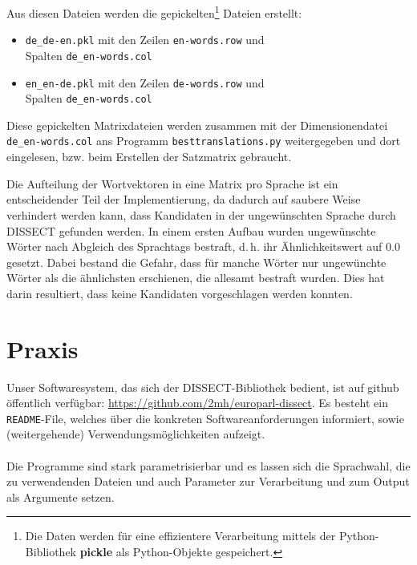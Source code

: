 \documentclass[11pt,twoside,openright]{mpreport}
\begin{document}
Aus diesen Dateien werden die gepickelten\footnote{Die Daten werden für eine effizientere Verarbeitung mittels der Python-Bibliothek \textbf{pickle} als Python-Objekte gespeichert.} Dateien erstellt:
\begin{itemize}
\item \verb+de_de-en.pkl+ mit den Zeilen \verb+en-words.row+ und \\Spalten \verb+de_en-words.col+
\item \verb+en_en-de.pkl+ mit den Zeilen \verb+de-words.row+ und \\Spalten \verb+de_en-words.col+
\end{itemize}

Diese gepickelten Matrixdateien werden zusammen mit der Dimensionendatei \verb+de_en-words.col+ ans Programm \verb+besttranslations.py+ weitergegeben und dort eingelesen, bzw. beim Erstellen der Satzmatrix gebraucht.

Die Aufteilung der Wortvektoren in eine Matrix pro Sprache ist ein entscheidender Teil der Implementierung, da dadurch auf saubere Weise verhindert werden kann, dass Kandidaten in der ungewünschten Sprache durch DISSECT gefunden werden. In einem ersten Aufbau wurden ungewünschte Wörter nach Abgleich des Sprachtags bestraft, d.\,h. ihr Ähnlichkeitswert auf 0.0 gesetzt. Dabei bestand die Gefahr, dass für manche Wörter nur ungewünchte Wörter als die ähnlichsten
erschienen, die allesamt bestraft wurden. Dies hat darin resultiert, dass
keine Kandidaten vorgeschlagen werden konnten.
\chapter{Praxis}
\label{cha:praxis}
Unser Softwaresystem, das sich der DISSECT-Bibliothek bedient, ist
auf github öffentlich verfügbar: \url{https://github.com/2mh/europarl-dissect}.
Es besteht ein \verb+README+-File, welches über die konkreten 
Softwareanforderungen informiert, sowie (weitergehende) 
Verwendungsmöglichkeiten aufzeigt.
\\
\\
Die Programme sind stark parametrisierbar und es lassen sich die Sprachwahl, die zu verwendenden Dateien und auch Parameter zur Verarbeitung und zum Output als Argumente setzen.
\end{document}
